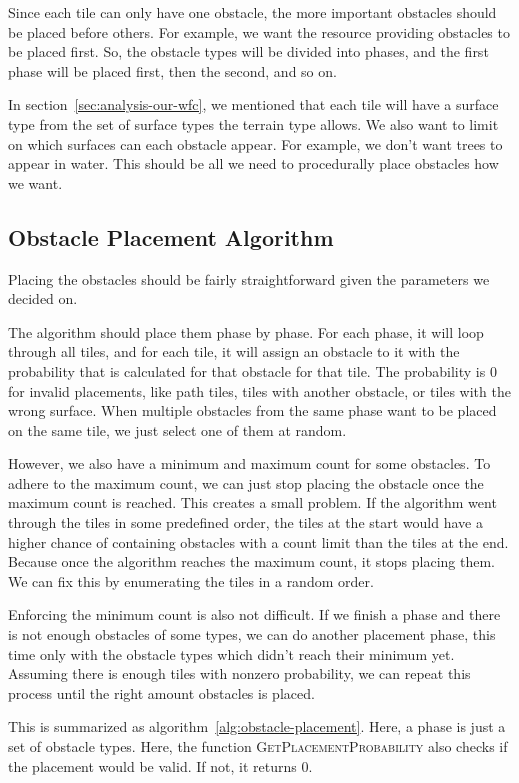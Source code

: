 Since each tile can only have one obstacle, the more important obstacles should be placed before others.
For example, we want the resource providing obstacles to be placed first.
So, the obstacle types will be divided into phases, and the first phase will be placed first, then the second, and so on.

In section~\ref{sec:analysis-our-wfc}, we mentioned that each tile will have a surface type from the set of surface types the terrain type allows.
We also want to limit on which surfaces can each obstacle appear.
For example, we don't want trees to appear in water.
This should be all we need to procedurally place obstacles how we want.

\subsection{Obstacle Placement Algorithm}

Placing the obstacles should be fairly straightforward given the parameters we decided on.

The algorithm should place them phase by phase.
For each phase, it will loop through all tiles, and for each tile, it will assign an obstacle to it with the probability that is calculated for that obstacle for that tile.
The probability is 0 for invalid placements, like path tiles, tiles with another obstacle, or tiles with the wrong surface.
When multiple obstacles from the same phase want to be placed on the same tile, we just select one of them at random.

However, we also have a minimum and maximum count for some obstacles.
To adhere to the maximum count, we can just stop placing the obstacle once the maximum count is reached.
This creates a small problem.
If the algorithm went through the tiles in some predefined order, the tiles at the start would have a higher chance of containing obstacles with a count limit than the tiles at the end.
Because once the algorithm reaches the maximum count, it stops placing them.
We can fix this by enumerating the tiles in a random order.

Enforcing the minimum count is also not difficult.
If we finish a phase and there is not enough obstacles of some types, we can do another placement phase, this time only with the obstacle types which didn't reach their minimum yet.
Assuming there is enough tiles with nonzero probability, we can repeat this process until the right amount obstacles is placed.

This is summarized as algorithm~\ref{alg:obstacle-placement}.
Here, a phase is just a set of obstacle types.
Here, the function \textsc{GetPlacementProbability} also checks if the placement would be valid.
If not, it returns 0.

